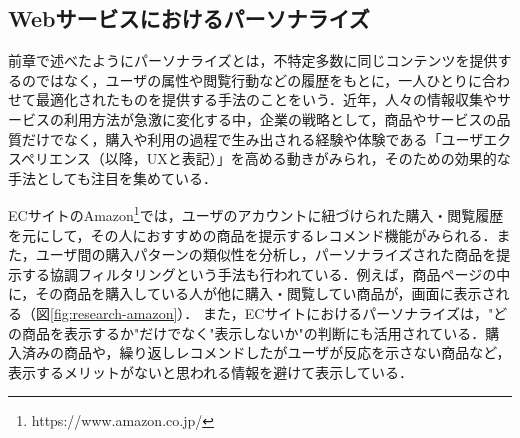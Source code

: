 \documentclass[a4paper]{jsarticle}
\begin{document}
\subsection{Webサービスにおけるパーソナライズ}
前章で述べたようにパーソナライズとは，不特定多数に同じコンテンツを提供するのではなく，ユーザの属性や閲覧行動などの履歴をもとに，一人ひとりに合わせて最適化されたものを提供する手法のことをいう．近年，人々の情報収集やサービスの利用方法が急激に変化する中，企業の戦略として，商品やサービスの品質だけでなく，購入や利用の過程で生み出される経験や体験である「ユーザエクスペリエンス（以降，UXと表記）」を高める動きがみられ，そのための効果的な手法としても注目を集めている\cite{izumi}．



ECサイトのAmazon\footnote{https://www.amazon.co.jp/}では，ユーザのアカウントに紐づけられた購入・閲覧履歴を元にして，その人におすすめの商品を提示するレコメンド機能がみられる．また，ユーザ間の購入パターンの類似性を分析し，パーソナライズされた商品を提示する協調フィルタリングという手法も行われている．例えば，商品ページの中に，その商品を購入している人が他に購入・閲覧してい商品が，画面に表示される（図\ref{fig:research-amazon}）．
また，ECサイトにおけるパーソナライズは，"どの商品を表示するか"だけでなく"表示しないか"の判断にも活用されている．購入済みの商品や，繰り返しレコメンドしたがユーザが反応を示さない商品など，表示するメリットがないと思われる情報を避けて表示している．
\end{document}
